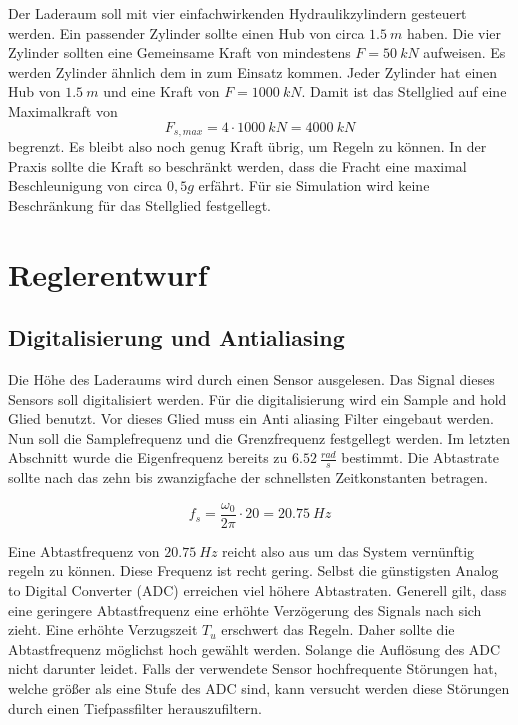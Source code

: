 Der Laderaum soll mit vier einfachwirkenden Hydraulikzylindern gesteuert werden. 
Ein passender Zylinder sollte einen Hub von circa $\SI{1,5}{m}$ haben.
Die vier Zylinder sollten eine Gemeinsame Kraft von mindestens $F = \SI{50}{kN}$ aufweisen.
Es werden Zylinder ähnlich dem in \cite{Zylinder} zum Einsatz kommen.
Jeder Zylinder hat einen Hub von $\SI{1,5}{m}$
und eine Kraft von $F = \SI{1000}{kN}$. Damit ist das Stellglied auf eine Maximalkraft von 
\begin{equation}
	F_{s, max} = 4 \cdot \SI{1000}{kN} = \SI{4000}{kN}
\end{equation}
begrenzt. Es bleibt also noch genug Kraft übrig, um Regeln zu können.
In der Praxis sollte die Kraft so beschränkt werden, dass die Fracht eine maximal Beschleunigung von circa $0,5g$ erfährt.
Für sie Simulation wird keine Beschränkung für das Stellglied festgellegt.

\section{Reglerentwurf}

\subsection{Digitalisierung und Antialiasing}
Die Höhe des Laderaums wird durch einen Sensor ausgelesen. Das Signal dieses Sensors soll digitalisiert werden.
Für die digitalisierung wird ein Sample and hold Glied benutzt. Vor dieses Glied muss ein Anti aliasing Filter eingebaut werden.
Nun soll die Samplefrequenz und die Grenzfrequenz festgellegt werden. Im letzten Abschnitt wurde die Eigenfrequenz bereits zu $\SI{6,52}{\frac{rad}{s}}$ bestimmt.
Die Abtastrate sollte nach \cite{NotholtVorlesung5} das zehn bis zwanzigfache der schnellsten
Zeitkonstanten betragen. 

\begin{equation}
	f_{s} = \frac{\omega_{0}}{2 \pi} \cdot 20 = \SI{20,75}{Hz}
\end{equation}

Eine Abtastfrequenz von $\SI{20,75}{Hz}$ reicht also aus um das System vernünftig regeln zu können. Diese Frequenz ist recht gering.
Selbst die günstigsten Analog to Digital Converter (ADC) erreichen viel höhere Abtastraten. 
Generell gilt, dass eine geringere Abtastfrequenz eine erhöhte Verzögerung des Signals nach sich zieht. Eine erhöhte Verzugszeit $T_{u}$
erschwert das Regeln. Daher sollte die Abtastfrequenz möglichst hoch gewählt werden. Solange die Auflösung des ADC nicht darunter leidet.
Falls der verwendete Sensor hochfrequente Störungen hat, welche größer als eine Stufe des ADC sind, kann versucht werden diese Störungen durch 
einen Tiefpassfilter herauszufiltern.

